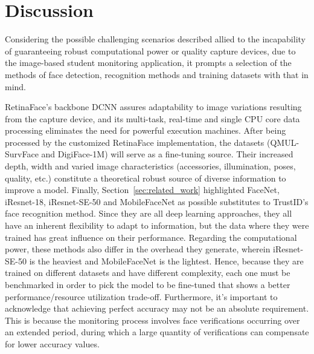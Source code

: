 \documentclass[class=report, crop=false, a4paper, 12pt]{standalone}
\begin{document}
\section{Discussion}
\par Considering the possible challenging scenarios described allied to the incapability of guaranteeing robust computational power or quality capture devices, due to the image-based student monitoring application, it prompts a selection of the methods of face detection, recognition methods and training datasets with that in mind. 
\par RetinaFace's backbone DCNN assures adaptability to image variations resulting from the capture device, and its multi-task, real-time and single CPU core data processing eliminates the need for powerful execution machines. After being processed by the customized RetinaFace implementation, the datasets (QMUL-SurvFace and DigiFace-1M) will serve as a fine-tuning source. Their increased depth, width and varied image characteristics (accessories, illumination, poses, quality, etc.) constitute a theoretical robust source of diverse information to improve a model. Finally, Section~\ref{sec:related_work} highlighted FaceNet, iResnet-18, iResnet-SE-50 and MobileFaceNet as possible substitutes to TrustID's face recognition method. Since they are all deep learning approaches, they all have an inherent flexibility to adapt to information, but the data where they were trained has great influence on their performance. Regarding the computational power, these methods also differ in the overhead they generate, wherein iResnet-SE-50 is the heaviest and MobileFaceNet is the lightest. Hence, because they are trained on different datasets and have different complexity, each one must be benchmarked in order to pick the model to be fine-tuned that shows a better performance/resource utilization trade-off. Furthermore, it's important to acknowledge that achieving perfect accuracy may not be an absolute requirement. This is because the monitoring process involves face verifications occurring over an extended period, during which a large quantity of verifications can compensate for lower accuracy values.
\end{document}
